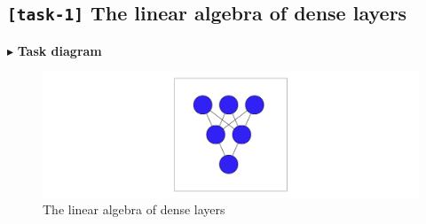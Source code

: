 \documentclass[11pt]{article}
\makeatletter
\newcommand{\boxspacing}{\kern\kvtcb@left@rule\kern\kvtcb@boxsep}
\newcommand{\prompt}[4]{
        \ttfamily\llap{{\color{#2}[#3]:\hspace{3pt}#4}}\vspace{-\baselineskip}
    }
\makeatother
\begin{document}
    \begin{tcolorbox}[breakable, size=fbox, boxrule=1pt, pad at break*=1mm,colback=cellbackground, colframe=cellborder]
\prompt{In}{incolor}{ }{\boxspacing}
\begin{Verbatim}[commandchars=\\\{\}]

\end{Verbatim}
\end{tcolorbox}

    \begin{tcolorbox}[breakable, size=fbox, boxrule=1pt, pad at break*=1mm,colback=cellbackground, colframe=cellborder]
\prompt{In}{incolor}{ }{\boxspacing}
\begin{Verbatim}[commandchars=\\\{\}]

\end{Verbatim}
\end{tcolorbox}

    \begin{tcolorbox}[breakable, size=fbox, boxrule=1pt, pad at break*=1mm,colback=cellbackground, colframe=cellborder]
\prompt{In}{incolor}{ }{\boxspacing}
\begin{Verbatim}[commandchars=\\\{\}]

\end{Verbatim}
\end{tcolorbox}

    \hypertarget{task-1-the-linear-algebra-of-dense-layers}{%
\subsection{\texorpdfstring{\texttt{{[}task-1{]}} The linear algebra of
dense
layers}{{[}task-1{]} The linear algebra of dense layers}}\label{task-1-the-linear-algebra-of-dense-layers}}

\(\blacktriangleright\) \textbf{Task diagram}

\begin{figure}
\centering
\includegraphics{../Figures/5. The linear algebra of dense layers.png}
\caption{The linear algebra of dense layers}
\end{figure}
\end{document}
